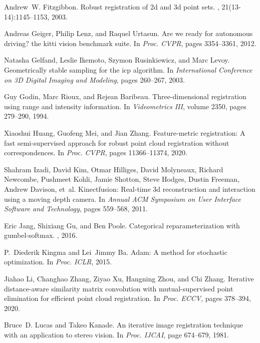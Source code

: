 \documentclass[10pt,twocolumn,letterpaper]{article}
\begin{document}
\begin{thebibliography}{10}
Andrew~W. Fitzgibbon.
\newblock Robust registration of 2d and 3d point sets.
, 21(13-14):1145--1153, 2003.

Andreas Geiger, Philip Lenz, and Raquel Urtasun.
\newblock Are we ready for autonomous driving? the kitti vision benchmark
  suite.
\newblock In {\em {Proc. CVPR}}, pages 3354--3361, 2012.

Natasha Gelfand, Leslie Ikemoto, Szymon Rusinkiewicz, and Marc Levoy.
\newblock Geometrically stable sampling for the icp algorithm.
\newblock In {\em International Conference on 3D Digital Imaging and Modeling},
  pages 260--267, 2003.

Guy Godin, Marc Rioux, and Rejean Baribeau.
\newblock Three-dimensional registration using range and intensity information.
\newblock In {\em Videometrics III}, volume 2350, pages 279--290, 1994.

Xiaoshui Huang, Guofeng Mei, and Jian Zhang.
\newblock Feature-metric registration: A fast semi-supervised approach for
  robust point cloud registration without correspondences.
\newblock In {\em {Proc. CVPR}}, pages 11366--11374, 2020.

Shahram Izadi, David Kim, Otmar Hilliges, David Molyneaux, Richard Newcombe,
  Pushmeet Kohli, Jamie Shotton, Steve Hodges, Dustin Freeman, Andrew Davison,
  et~al.
\newblock Kinectfusion: Real-time 3d reconstruction and interaction using a
  moving depth camera.
\newblock In {\em Annual ACM Symposium on User Interface Software and
  Technology}, pages 559--568, 2011.

Eric Jang, Shixiang Gu, and Ben Poole.
\newblock Categorical reparameterization with gumbel-softmax.
, 2016.

P.~Diederik Kingma and Lei~Jimmy Ba.
\newblock Adam: A method for stochastic optimization.
\newblock In {\em {Proc. ICLR}}, 2015.

Jiahao Li, Changhao Zhang, Ziyao Xu, Hangning Zhou, and Chi Zhang.
\newblock Iterative distance-aware similarity matrix convolution with
  mutual-supervised point elimination for efficient point cloud registration.
\newblock In {\em {Proc. ECCV}}, pages 378--394, 2020.

Bruce~D. Lucas and Takeo Kanade.
\newblock An iterative image registration technique with an application to
  stereo vision.
\newblock In {\em {Proc. IJCAI}}, page 674–679, 1981.


\end{thebibliography}
\end{document}
